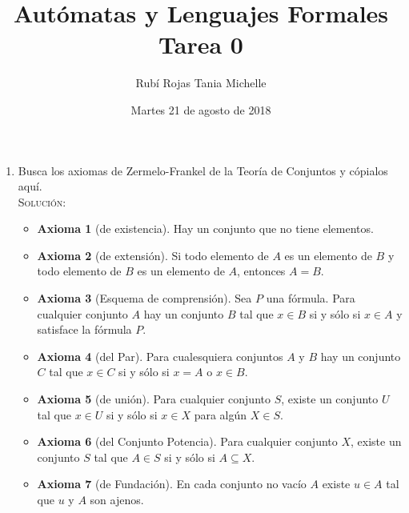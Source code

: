 \documentclass[letterpaper,11pt]{article}
\title{Autómatas y Lenguajes Formales \\ Tarea 0}
\author{Rubí Rojas Tania Michelle}
\date{Martes 21 de agosto de 2018}
\begin{document}
    \maketitle
    
    \begin{enumerate}
        
        \item Busca los axiomas de Zermelo-Frankel de la Teoría de Conjuntos y
        cópialos aquí. \\
        \textsc{Solución:}
        
        \begin{itemize}
            
            \item \textbf{Axioma 1} (de existencia). Hay un conjunto que no
            tiene elementos.
            
            \item \textbf{Axioma 2} (de extensión). Si todo elemento de $A$ es
            un elemento de $B$ y todo elemento de $B$ es un elemento de $A$,
            entonces $A = B$.
            
            \item \textbf{Axioma 3} (Esquema de comprensión). Sea $P$ una
            fórmula. Para cualquier conjunto $A$ hay un conjunto $B$ tal que 
            $x \in B$ si y sólo si $x \in A$ y satisface la fórmula $P$.
            
            \item \textbf{Axioma 4} (del Par). Para cualesquiera conjuntos $A$ 
            y $B$ hay un conjunto $C$ tal que $x \in C$ si y sólo si $x = A$ o
            $x \in B$.
            
            \item \textbf{Axioma 5} (de unión). Para cualquier conjunto $S$,
            existe un conjunto $U$ tal que $x \in U$ si y sólo si $x \in X$
            para algún $X \in S$.
            
            \item \textbf{Axioma 6} (del Conjunto Potencia). Para cualquier 
            conjunto $X$, existe un conjunto $S$ tal que $A \in S$ si y sólo si
            $A \subseteq X$.
            
            \item \textbf{Axioma 7} (de Fundación). En cada conjunto no vacío
            $A$ existe $u \in A$ tal que $u$ y $A$ son ajenos.
            

\end{itemize}
\end{enumerate}
\end{document}
